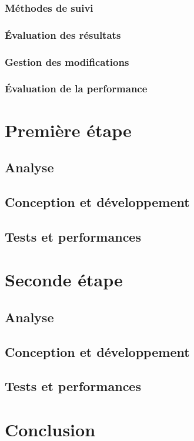 \documentclass[a4paper, 12pt]{report}
\begin{document}
        \subsection{Méthodes de suivi}
        \subsection{Évaluation des résultats}
        \subsection{Gestion des modifications}
        \subsection{Évaluation de la performance}
    

\chapter{Première étape}
\minitoc
{}
\clearpage
    \section{Analyse}
    \section{Conception et développement}
    \section{Tests et performances}


\chapter{Seconde étape}
\minitoc
{}
\clearpage
    \section{Analyse}
    \section{Conception et développement}
    \section{Tests et performances}

\chapter{Conclusion}
\minitoc
{}
\clearpage
\end{document}
